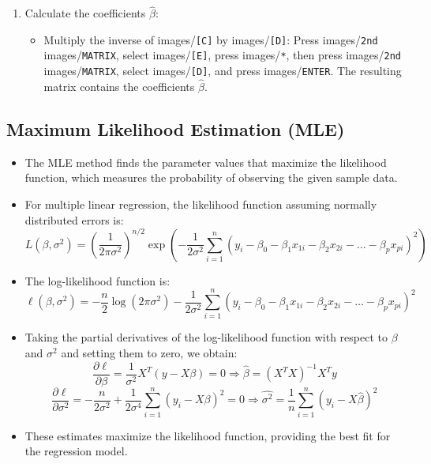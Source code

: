 \documentclass{article}
\newcommand{\code}[1]{images/\colorbox{light-gray}{\texttt{#1}}}
\begin{document}
\begin{enumerate}
\begin{itemize}
    \end{itemize}
    \item Calculate the coefficients $\hat{\beta}$:
    \begin{itemize}
        \item Multiply the inverse of \code{[C]} by \code{[D]}: Press \code{2nd} \code{MATRIX}, select \code{[E]}, press \code{*}, then press \code{2nd} \code{MATRIX}, select \code{[D]}, and press \code{ENTER}. The resulting matrix contains the coefficients $\hat{\beta}$.
    \end{itemize}
\end{enumerate}
    
\subsection{Maximum Likelihood Estimation (MLE)}

\begin{itemize}
    \item The MLE method finds the parameter values that maximize the likelihood function, which measures the probability of observing the given sample data.
    \item For multiple linear regression, the likelihood function assuming normally distributed errors is:
    \[
    L(\beta, \sigma^2) = \left( \frac{1}{2\pi\sigma^2} \right)^{n/2} \exp\left(-\frac{1}{2\sigma^2} \sum_{i=1}^{n} (y_i - \beta_0 - \beta_1 x_{1i} - \beta_2 x_{2i} - \dots - \beta_p x_{pi})^2 \right)
    \]
    \item The log-likelihood function is:
    \[
    \ell(\beta, \sigma^2) = -\frac{n}{2} \log(2\pi\sigma^2) - \frac{1}{2\sigma^2} \sum_{i=1}^{n} (y_i - \beta_0 - \beta_1 x_{1i} - \beta_2 x_{2i} - \dots - \beta_p x_{pi})^2
    \]
    \item Taking the partial derivatives of the log-likelihood function with respect to $\beta$ and $\sigma^2$ and setting them to zero, we obtain:
    \[
    \frac{\partial \ell}{\partial \beta} = \frac{1}{\sigma^2} X^T (y - X\beta) = 0 \Rightarrow \hat{\beta} = (X^TX)^{-1}X^Ty
    \]
    \[
    \frac{\partial \ell}{\partial \sigma^2} = -\frac{n}{2\sigma^2} + \frac{1}{2\sigma^4} \sum_{i=1}^{n} (y_i - X\beta)^2 = 0 \Rightarrow \hat{\sigma^2} = \frac{1}{n} \sum_{i=1}^{n} (y_i - X\hat{\beta})^2
    \]
    \item These estimates maximize the likelihood function, providing the best fit for the regression model.
\end{itemize}
\end{document}
